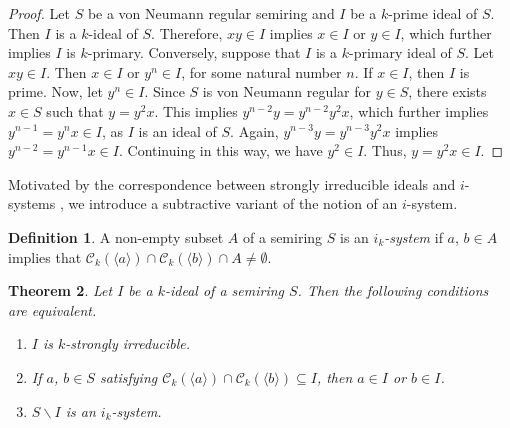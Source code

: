 \documentclass[11pt,english]{amsart}
\newtheorem{theorem}{Theorem}[section]
\theoremstyle{definition}
\newtheorem{definition}[theorem]{Definition}
\numberwithin{equation}{section}
\begin{document}
\begin{proof}
    Let $S$ be a von Neumann regular semiring and $I$ be a $k$-prime ideal of $S$. Then $I$ is a $k$-ideal of $S$. Therefore, $xy \in I$ implies $x \in I$ or $y \in I$, which further implies $I$ is $k$-primary.
    Conversely, suppose that $I$ is a $k$-primary ideal of $S$. Let $xy \in I$. Then $x \in I$ or $y^n \in I $, for some natural number $n$. If $x \in I$, then $I$ is prime. Now, let $y^n \in I$. Since $S$ is von Neumann regular for $y \in S$, there exists $x \in S$ such that $y=y^2x$. This implies $y^{n-2} y = y^{n-2}y^2x$, which further implies $y^{n-1}=y^nx \in I$, as $I$ is an ideal of $S$. Again, $y^{n-3} y=y^{n-3} y^2x$ implies $y^{n-2}=y^{n-1}x \in I$. Continuing in this way, we have $y^2 \in I$. Thus, $y=y^2x \in I$.
\end{proof}

Motivated by the correspondence between strongly irreducible ideals and $i$-systems \cite[Proposition 7.33]{Golan}, we introduce a subtractive variant of the notion of an $i$-system.

\begin{definition}
    A non-empty subset $A$ of a semiring $S$ is an \emph{$i_k$-system} if $a$, $b \in A $ implies that $\mathcal{C}_k(\langle a\rangle) \cap \mathcal{C}_k(\langle b\rangle) \cap A \neq \emptyset$.
\end{definition}

\begin{theorem}\label{loc11}
    Let $I$ be a $k$-ideal of a semiring $S$. Then the following conditions are equivalent.
    \begin{enumerate}
        \item $I$ is $k$-strongly irreducible.
        \item If $a$, $b \in S$ satisfying $\mathcal{C}_k(\langle a\rangle) \cap \mathcal{C}_k(\langle b\rangle) \subseteq I$, then $a \in I$ or $b \in I$.
        \item $S\backslash I$ is an $i_k$-system.
    \end{enumerate}
\end{theorem}
\end{document}
